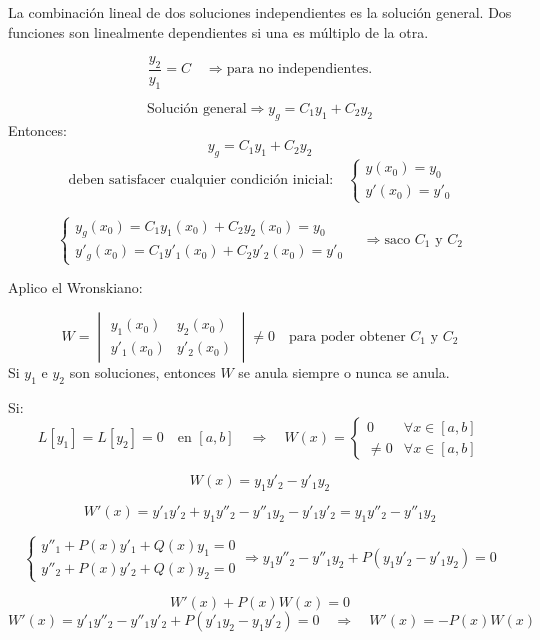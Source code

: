 \documentclass[a4paper,12pt]{article}
\begin{document}
\newpage
\noindent
La combinación lineal de dos soluciones independientes es la solución general.  
Dos funciones son linealmente dependientes si una es múltiplo de la otra.

\[
\frac{y_2}{y_1 } = C  \quad \Longrightarrow \text{para no independientes.}
\]

\[
\text{Solución general} \Rightarrow y_g = C_1 y_1 + C_2 y_2
\]
Entonces: 
\[
y_g = C_1 y_1 + C_2 y_2 
\]
\[
\text{ deben satisfacer cualquier condición inicial:} 
\quad 
\begin{cases}
y(x_0) = y_0 \\
y'(x_0) = y'_0
\end{cases}
\]


\[
\begin{cases}
y_g(x_0) = C_1 y_1(x_0) + C_2 y_2(x_0) = y_0 \\
y'_g(x_0) = C_1 y'_1(x_0) + C_2 y'_2(x_0) = y'_0
\end{cases}
\quad \Rightarrow \text{saco } C_1 \text{ y } C_2
\]

\bigskip
\noindent
Aplico el Wronskiano:

\[
W = 
\begin{vmatrix}
y_1(x_0) & y_2(x_0) \\
y'_1(x_0) & y'_2(x_0)
\end{vmatrix}
\neq 0
\quad \text{para poder obtener } C_1 \text{ y } C_2
\]
Si \( y_1 \) e \( y_2 \) son soluciones, entonces \( W \) se anula siempre o nunca se anula.

\medskip
\noindent
Si:
\[
L[y_1] = L[y_2] = 0 \quad \text{en } [a,b] 
\quad \Rightarrow \quad 
W(x) = 
\begin{cases}
0 & \forall x \in [a,b] \\
\neq 0 & \forall x \in [a,b]
\end{cases}
\]

\[
W(x) = y_1 y'_2 - y'_1 y_2
\]

\[
W'(x) = y'_1 y'_2 + y_1 y''_2 - y''_1 y_2 - y'_1 y'_2 = y_1 y''_2 - y''_1 y_2
\]

\[
\begin{cases}
y''_1 + P(x)y'_1 + Q(x)y_1 = 0 \\
y''_2 + P(x)y'_2 + Q(x)y_2 = 0
\end{cases}
\Rightarrow 
y_1 y''_2 - y''_1 y_2 + P(y_1 y'_2 - y'_1 y_2) = 0
\]

\[
W'(x) + P(x)W(x) = 0
\]
\vspace{-0,5 em}
\[
W'(x) = y'_1 y''_2 - y''_1 y'_2 + P(y'_1 y_2 - y_1 y'_2) = 0
\quad \Longrightarrow \quad
W'(x) = -P(x)W(x)
\]
\end{document}
